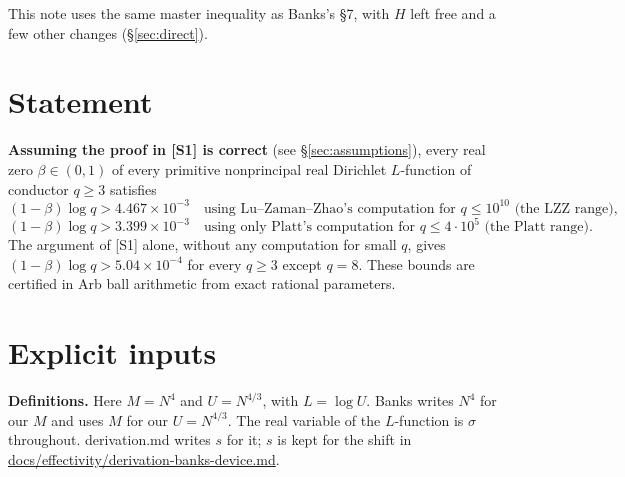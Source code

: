 \documentclass[11pt]{article}
\begin{document}
This note uses the same master inequality as Banks's \S7, with $H$ left free and a few other changes (\S\ref{sec:direct}).

\section{Statement}

\textbf{Assuming the proof in [S1] is correct} (see \S\ref{sec:assumptions}), every real zero $\beta\in(0,1)$ of every primitive nonprincipal real Dirichlet $L$-function of conductor $q\ge 3$ satisfies
\[
(1-\beta)\log q > 4.467\times 10^{-3}\quad\text{using Lu--Zaman--Zhao's computation for } q\le 10^{10}\text{ (the LZZ range)},
\]
\[
(1-\beta)\log q > 3.399\times 10^{-3}\quad\text{using only Platt's computation for } q\le 4\cdot 10^5\text{ (the Platt range).}
\]
The argument of [S1] alone, without any computation for small $q$, gives $(1-\beta)\log q > 5.04\times 10^{-4}$ for every $q\ge 3$ except $q=8$.
These bounds are certified in Arb ball arithmetic from exact rational parameters.

\section{Explicit inputs}

\noindent\textbf{Definitions.} Here $M=N^4$ and $U=N^{4/3}$, with $L=\log U$. Banks writes $N^4$ for our $M$ and uses $M$ for our $U=N^{4/3}$. The real variable of the $L$-function is $\sigma$ throughout. derivation.md writes $s$ for it; $s$ is kept for the shift in \url{docs/effectivity/derivation-banks-device.md}.
\end{document}
